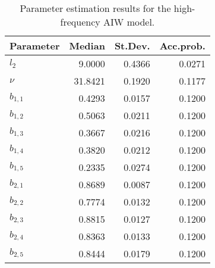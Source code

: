 \begin{table}[ht]
\centering
\caption{Parameter estimation results for the high-frequency AIW model.} 
\label{table:all_pars_hf_EX}
\begingroup\footnotesize
\begin{tabular}{lrrr}
  \hline
Parameter & Median & St.Dev. & Acc.prob. \\ 
  \hline
$l_2$ & 9.0000 & 0.4366 & 0.0271 \\ 
  $\nu$ & 31.8421 & 0.1920 & 0.1177 \\ 
  $b_{1,1}$ & 0.4293 & 0.0157 & 0.1200 \\ 
  $b_{1,2}$ & 0.5063 & 0.0211 & 0.1200 \\ 
  $b_{1,3}$ & 0.3667 & 0.0216 & 0.1200 \\ 
  $b_{1,4}$ & 0.3820 & 0.0212 & 0.1200 \\ 
  $b_{1,5}$ & 0.2335 & 0.0274 & 0.1200 \\ 
  $b_{2,1}$ & 0.8689 & 0.0087 & 0.1200 \\ 
  $b_{2,2}$ & 0.7774 & 0.0132 & 0.1200 \\ 
  $b_{2,3}$ & 0.8815 & 0.0127 & 0.1200 \\ 
  $b_{2,4}$ & 0.8363 & 0.0133 & 0.1200 \\ 
  $b_{2,5}$ & 0.8444 & 0.0179 & 0.1200 \\ 
   \hline
\end{tabular}
\endgroup
\end{table}
